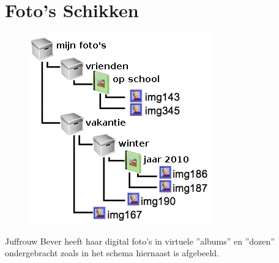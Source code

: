 \documentclass[12pt]{article}
\begin{document}
	\begin{minipage}{\textwidth}
		\section{Foto's Schikken}
			\begin{figure} 
				\includegraphics[width=\linewidth]{image3}
			\end{figure}
			
			Juffrouw Bever heeft haar digital foto's in virtuele ''albums'' en ''dozen'' ondergebracht zoals in het schema hiernaast is afgebeeld. \vspace{0.5cm}


\end{minipage}
\end{document}
